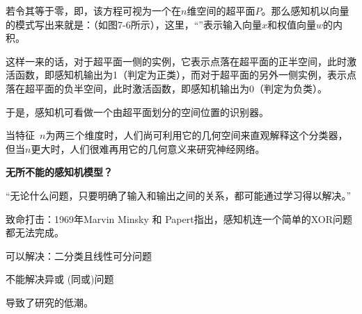 若令其等于零，即，该方程可视为一个在$n$维空间的超平面$P$。那么感知机以向量的模式写出来就是：（如图7-6所示），这里，“”表示输入向量$x$和权值向量$w$的内积。

这样一来的话，对于超平面一侧的实例，它表示点落在超平面的正半空间，此时激活函数，即感知机输出为1（判定为正类），而对于超平面的另外一侧实例，表示点落在超平面的负半空间，此时激活函数，即感知机输出为0（判定为负类）。

于是，感知机可看做一个由超平面划分的空间位置的识别器。

当特征~$n$为两三个维度时，人们尚可利用它的几何空间来直观解释这个分类器，但当$n$更大时，人们很难再用它的几何意义来研究神经网络。

{\bf 无所不能的感知机模型？}

“无论什么问题，只要明确了输入和输出之间的关系，都可能通过学习得以解决。”


致命打击：1969年Marvin Minsky 和 Papert指出，感知机连一个简单的XOR问题都无法完成。

可以解决：二分类且线性可分问题

不能解决异或 (同或)问题

导致了研究的低潮。


